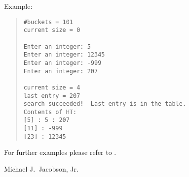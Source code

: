 Example:
\begin{quote}
\begin{verbatim}
#buckets = 101
current size = 0

Enter an integer: 5
Enter an integer: 12345
Enter an integer: -999
Enter an integer: 207

current size = 4
last entry = 207
search succeeded!  Last entry is in the table.
Contents of HT:
[5] : 5 : 207
[11] : -999
[23] : 12345
\end{verbatim}
\end{quote}

For further examples please refer to .



\AUTHOR

Michael J.~Jacobson, Jr.

